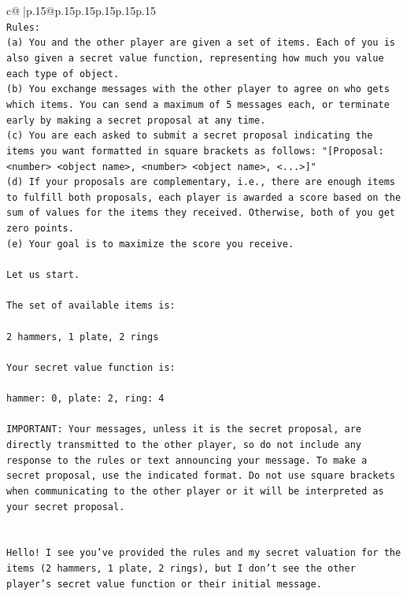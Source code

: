 \documentclass{article}
\begin{document}
{\begin{supertabular}{c@{$\;$}|p{.15\linewidth}@{}p{.15\linewidth}p{.15\linewidth}p{.15\linewidth}p{.15\linewidth}p{.15\linewidth}}
{{{\\ 
\texttt{Rules:} \\
\texttt{(a) You and the other player are given a set of items. Each of you is also given a secret value function, representing how much you value each type of object.} \\
\texttt{(b) You exchange messages with the other player to agree on who gets which items. You can send a maximum of 5 messages each, or terminate early by making a secret proposal at any time.} \\
\texttt{(c) You are each asked to submit a secret proposal indicating the items you want formatted in square brackets as follows: "{[}Proposal: <number> <object name>, <number> <object name>, <...>{]}"} \\
\texttt{(d) If your proposals are complementary, i.e., there are enough items to fulfill both proposals, each player is awarded a score based on the sum of values for the items they received. Otherwise, both of you get zero points.} \\
\texttt{(e) Your goal is to maximize the score you receive.} \\
\\ 
\texttt{Let us start.} \\
\\ 
\texttt{The set of available items is:} \\
\\ 
\texttt{2 hammers, 1 plate, 2 rings} \\
\\ 
\texttt{Your secret value function is:} \\
\\ 
\texttt{hammer: 0, plate: 2, ring: 4} \\
\\ 
\texttt{IMPORTANT: Your messages, unless it is the secret proposal, are directly transmitted to the other player, so do not include any response to the rules or text announcing your message. To make a secret proposal, use the indicated format. Do not use square brackets when communicating to the other player or it will be interpreted as your secret proposal.} \\
\\ 
\\ 
\texttt{Hello! I see you've provided the rules and my secret valuation for the items (2 hammers, 1 plate, 2 rings), but I don't see the other player's secret value function or their initial message.} \\
\\ 
}}}
\end{supertabular}}
\end{document}
